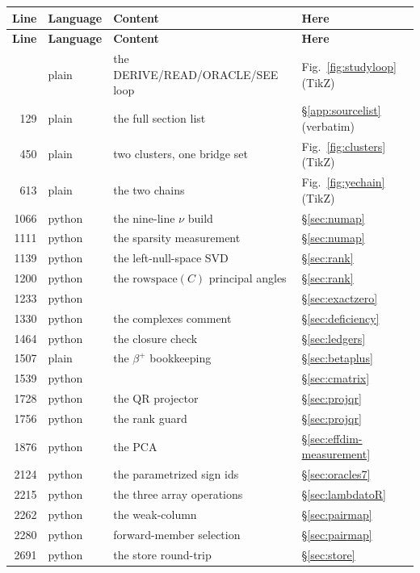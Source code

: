 \begingroup
\footnotesize
\begin{longtable}{@{}r L{2.0cm} L{5.6cm} L{5.2cm}@{}}
\toprule
\textbf{Line} & \textbf{Language} & \textbf{Content} & \textbf{Here} \\
\midrule
\endfirsthead
\toprule
\textbf{Line} & \textbf{Language} & \textbf{Content} & \textbf{Here} \\
\midrule
\endhead
\bottomrule
{} & plain & the DERIVE/READ/ORACLE/SEE loop &
  Fig.~\ref{fig:studyloop} (TikZ) \\
129 & plain & the full section list &
  \S\ref{app:sourcelist} (verbatim) \\
450 & plain & two clusters, one bridge set &
  Fig.~\ref{fig:clusters} (TikZ) \\
613 & plain & the two \Ye{} chains &
  Fig.~\ref{fig:yechain} (TikZ) \\
1066 & python & the nine-line $\nu$ build & \S\ref{sec:numap} \\
1111 & python & the sparsity measurement & \S\ref{sec:numap} \\
1139 & python & the left-null-space SVD & \S\ref{sec:rank} \\
1200 & python & the $\mathrm{rowspace}(C)$ principal angles &
  \S\ref{sec:rank} \\
1233 & python &  & \S\ref{sec:exactzero} \\
1330 & python & the complexes comment & \S\ref{sec:deficiency} \\
1464 & python & the closure check & \S\ref{sec:ledgers} \\
1507 & plain & the $\beta^+$ bookkeeping & \S\ref{sec:betaplus} \\
1539 & python &  & \S\ref{sec:cmatrix} \\
1728 & python & the QR projector & \S\ref{sec:projqr} \\
1756 & python & the rank guard & \S\ref{sec:projqr} \\
1876 & python & the PCA & \S\ref{sec:effdim-measurement} \\
2124 & python & the parametrized sign ids & \S\ref{sec:oracles7} \\
2215 & python & the three array operations & \S\ref{sec:lambdatoR} \\
2262 & python & the weak-column  & \S\ref{sec:pairmap} \\
2280 & python & forward-member selection & \S\ref{sec:pairmap} \\
2691 & python & the store round-trip & \S\ref{sec:store} \\

\end{longtable}
